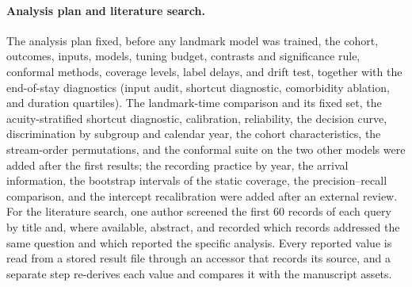 \paragraph{Analysis plan and literature search.} The analysis plan fixed, before any landmark model was trained, the cohort, outcomes, inputs, models, tuning budget, contrasts and significance rule, conformal methods, coverage levels, label delays, and drift test, together with the end-of-stay diagnostics (input audit, shortcut diagnostic, comorbidity ablation, and duration quartiles). The landmark-time comparison and its fixed set, the acuity-stratified shortcut diagnostic, calibration, reliability, the decision curve, discrimination by subgroup and calendar year, the cohort characteristics, the stream-order permutations, and the conformal suite on the two other models were added after the first results; the recording practice by year, the arrival information, the bootstrap intervals of the static coverage, the precision--recall comparison, and the intercept recalibration were added after an external review. For the literature search, one author screened the first 60 records of each query by title and, where available, abstract, and recorded which records addressed the same question and which reported the specific analysis. Every reported value is read from a stored result file through an accessor that records its source, and a separate step re-derives each value and compares it with the manuscript assets.
